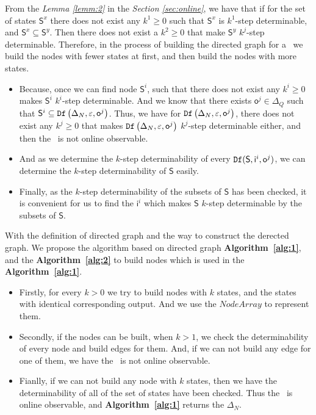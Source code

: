 From the {\em Lemma \ref{lemm:2}} in the {\em Section \ref{sec:online}}, we have that if for the set of states $\mathsf{S}^x$ there does not exist any $k^{1}\ge 0$ such that $\mathsf{S}^{x}$ is $k^{1}$-step determinable, and $\mathsf{S}^{x}\subseteq \mathsf{S}^{y}$. Then there does not exist a $k^{2}\ge 0$ that make $\mathsf{S}^{y}$ $k^{j}$-step determinable. Therefore, in the process of building the directed graph for a \BCN\ we build the nodes with fewer states at first, and then build the nodes with more states.
\begin{itemize}
\item  Because, once we can find node $\mathsf{S}^i$, such that there does not exist any $k^{i}\ge0$ makes $\mathsf{S}^{i}$ $k^{i}$-step determinable. And we know that there exists $\mathsf{o}^{j}\in \Delta_Q$ such that $\mathsf{S}^{i}\subseteq {\tt Df}\left(\Delta_N,\varepsilon, \mathsf{o}^{j}\right)$. Thus, we have for ${\tt Df}\left(\Delta_N,\varepsilon, \mathsf{o}^{j}\right)$, there does not exist any $k^{j}\ge 0$ that makes  ${\tt Df}\left(\Delta_N,\varepsilon, \mathsf{o}^{j}\right)$ $k^{j}$-step determinable either, and then the \BCN\ is not online observable.
\item And as we determine the $k$-step determinability of every ${\tt Df}(\mathsf{S},\mathsf{i}^{i},\mathsf{o}^{j})$, we can determine the $k$-step determinability of $\mathsf{S}$ easily.
\item  Finally, as the $k$-step determinability of the subsets of $\mathsf{S}$ has been checked, it is convenient for us to find the $\mathsf{i}^{i}$ which makes $\mathsf{S}$ $k$-step determinable by the subsets of $\mathsf{S}$.
 \end{itemize}
 
With the definition of directed graph and the way to construct the derected graph. We propose the algorithm based on directed graph {\bf Algorithm~\ref{alg:1}}, and the {\bf Algorithm~\ref{alg:2}} to build nodes which is used in the {\bf Algorithm~\ref{alg:1}}.

\begin{itemize}
\item  Firstly, for every $k>0$ we try to build nodes with $k$ states, and the states with identical corresponding output. And we use the $NodeArray$ to represent them.
\item Secondly, if the nodes can  be built, when $k>1$, we check the determinability of every node and build edges for them. And, if we can not build any edge for one of them, we have the \BCN\ is not online observable.
\item Fianlly, if we can not build any node with $k$ states, then we have the determinability of all of the set of states have been checked. Thus the \BCN\ is online observable, and {\bf Algorithm~\ref{alg:1}} returns the $\Delta_N$.
 \end{itemize}

